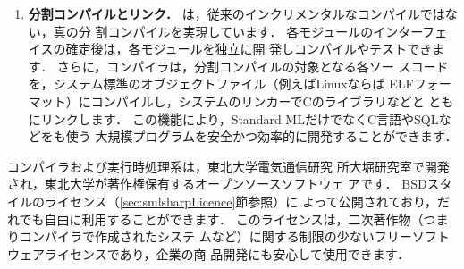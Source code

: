 \begin{enumerate}
\item {\bf 分割コンパイルとリンク．}
	\smlsharp{}は，従来のインクリメンタルなコンパイルではない，真の分
割コンパイルを実現しています．
	各モジュールのインターフェイスの確定後は，各モジュールを独立に開
発しコンパイルやテストできます．
	さらに，\smlsharp{}コンパイラは，分割コンパイルの対象となる各ソー
スコードを，システム標準のオブジェクトファイル（例えばLinuxならば
ELFフォーマット）にコンパイルし，システムのリンカーでCのライブラリなどと
ともにリンクします．
	この機能により，Standard MLだけでなくC言語やSQLなどをも使う
大規模プログラムを安全かつ効率的に開発することができます．

\end{enumerate}

	\smlsharp{}コンパイラおよび実行時処理系は，東北大学電気通信研究
所大堀研究室で開発され，東北大学が著作権保有するオープンソースソフトウェ
アです．
	BSDスタイルの\smlsharp{}ライセンス（\ref{sec:smlsharpLicence}節参照）に
よって公開されており，だれでも自由に利用することができます．
	このライセンスは，二次著作物（つまりコンパイラで作成されたシステ
ムなど）に関する制限の少ないフリーソフトウェアライセンスであり，企業の商
品開発にも安心して使用できます．

